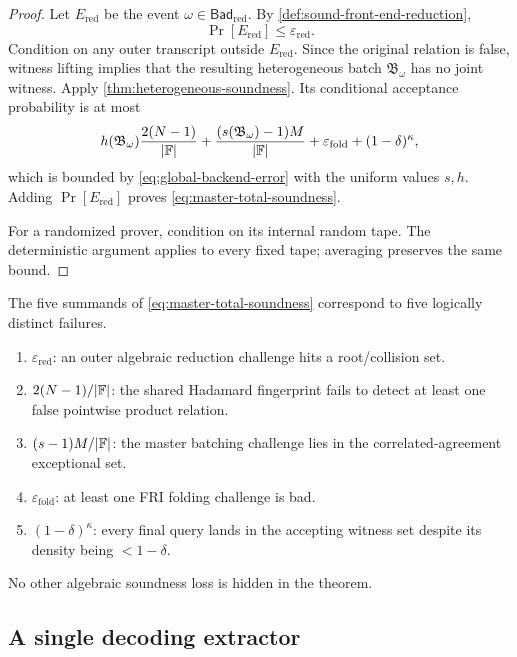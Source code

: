 \begin{proof}
Let $E_{\mathrm{red}}$ be the event $\omega\in\mathsf{Bad}_{\mathrm{red}}$.  By \cref{def:sound-front-end-reduction},
\[
  \Pr[E_{\mathrm{red}}]\le\varepsilon_{\mathrm{red}}.
\]
Condition on any outer transcript outside $E_{\mathrm{red}}$.  Since the original relation is false, witness lifting implies that the resulting heterogeneous batch $\mathfrak B_\omega$ has no joint witness.  Apply \cref{thm:heterogeneous-soundness}.  Its conditional acceptance probability is at most
\[
  h(\mathfrak B_\omega)\frac{2(N-1)}{|\mathbb{F}|}
  +\frac{(s(\mathfrak B_\omega)-1)M}{|\mathbb{F}|}
  +\varepsilon_{\mathrm{fold}}
  +(1-\delta)^\kappa,
\]
which is bounded by \eqref{eq:global-backend-error} with the uniform values $s,h$.  Adding $\Pr[E_{\mathrm{red}}]$ proves \eqref{eq:master-total-soundness}.

For a randomized prover, condition on its internal random tape.  The deterministic argument applies to every fixed tape; averaging preserves the same bound.
\end{proof}

\begin{remark}
\label{rem:global-error-provenance}
The five summands of \eqref{eq:master-total-soundness} correspond to five logically distinct failures.
\begin{enumerate}[label=(\arabic*),leftmargin=*]
  \item $\varepsilon_{\mathrm{red}}$: an outer algebraic reduction challenge hits a root/collision set.
  \item $2(N-1)/|\mathbb{F}|$: the shared Hadamard fingerprint fails to detect at least one false pointwise product relation.
  \item $(s-1)M/|\mathbb{F}|$: the master batching challenge lies in the correlated-agreement exceptional set.
  \item $\varepsilon_{\mathrm{fold}}$: at least one FRI folding challenge is bad.
  \item $(1-\delta)^\kappa$: every final query lands in the accepting witness set despite its density being $<1-\delta$.
\end{enumerate}
No other algebraic soundness loss is hidden in the theorem.
\end{remark}

\subsection{A single decoding extractor}
\label{sec:global-decoding-extractor}

